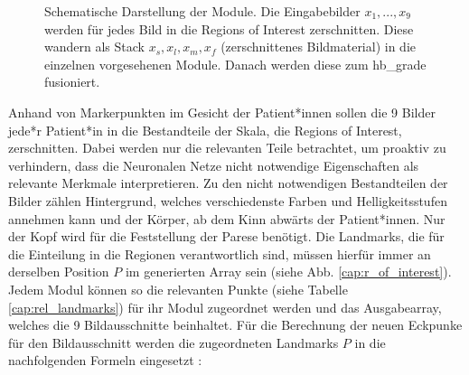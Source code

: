 \begin{figure}[!tb]
\caption[Darstellung der Modulbauweise]{{Schematische Darstellung der Module. Die Eingabebilder $x_1, ..., x_9$ werden für jedes Bild in die Regions of Interest zerschnitten. Diese wandern als Stack $x_s, x_l, x_m, x_f$ (zerschnittenes Bildmaterial) in die einzelnen vorgesehenen Module. Danach werden diese zum \ac{hb_grade} fusioniert.}\label{cap:module_graph}}
\end{figure}\label{fig:module_graph}

Anhand von Markerpunkten im Gesicht der Patient*innen sollen die 9 Bilder jede*r Patient*in in die Bestandteile der Skala, die Regions of Interest, zerschnitten. Dabei werden nur die relevanten Teile betrachtet, um proaktiv zu verhindern, dass die Neuronalen Netze nicht notwendige Eigenschaften als relevante Merkmale interpretieren. Zu den nicht notwendigen Bestandteilen der Bilder zählen Hintergrund, welches verschiedenste Farben und Helligkeitsstufen annehmen kann und der Körper, ab dem Kinn abwärts der Patient*innen. Nur der Kopf wird für die Feststellung der Parese benötigt. Die Landmarks, die für die Einteilung in die Regionen verantwortlich sind, müssen hierfür immer an derselben Position $P$ im generierten Array sein (siehe Abb. \ref{cap:r_of_interest}). Jedem Modul können so die relevanten Punkte (siehe Tabelle \ref{cap:rel_landmarks}) für ihr Modul zugeordnet werden und das Ausgabearray, welches die 9 Bildausschnitte beinhaltet. Für die Berechnung der neuen Eckpunke für den Bildausschnitt werden die zugeordneten Landmarks $P$ in die nachfolgenden Formeln eingesetzt \cite{s151026756}:

